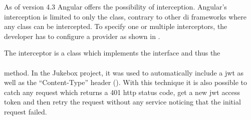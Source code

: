 As of version 4.3 Angular offers the possibility of interception. Angular's interception is limited to only the  class, contrary to other \gls{di} frameworks where any class can be intercepted. To specify one or multiple interceptors, the developer has to configure a provider as shown in .


The interceptor is a class which implements the  interface and thus the \\  \\ method. In the Jukebox project, it was used to automatically include a \gls{jwt} as well as the \enquote{Content-Type} header (). With this technique it is also possible to catch any request which returns a 401 \gls{http} status code, get a new \gls{jwt} access token and then retry the request without any service noticing that the initial request failed.
